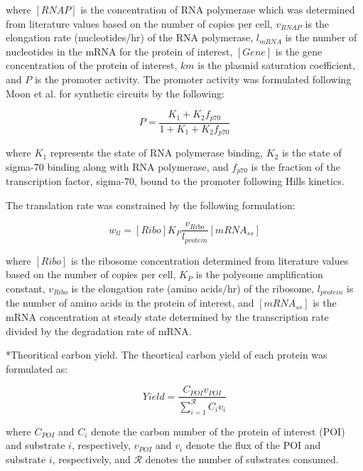 \documentclass[12pt]{article}
\makeatletter
\renewcommand\subsection{\@startsection
	{subsection}{2}{0mm}
	{-0.05in}
	{-0.5\baselineskip}
	{\normalfont\normalsize\bfseries}}
\makeatother
\begin{document}
where $[RNAP]$ is the concentration of RNA polymerase which was determined from literature values based on the number of copies per cell, $v_{RNAP}$ is the elongation rate (nucleotides/hr) of the RNA polymerase, $l_{mRNA}$ is the number of nucleotides in the mRNA for the protein of interest, $[Gene]$ is the gene concentration of the protein of interest, $km$ is the plasmid saturation coefficient, and $P$ is the promoter activity. 
The promoter activity was formulated following Moon et al. for synthetic circuits by the following:

\begin{equation}\nonumber
	P = \frac{K_{1}+K_{2}f_{p70}}{1 + K_{1}+K_{2}f_{p70}}
\end{equation}

where $K_{1}$ represents the state of RNA polymerase binding, $K_{2}$ is the state of sigma-70 binding along with RNA polymerase, and $f_{p70}$ is the fraction of the transcription factor, sigma-70, bound to the promoter following Hills kinetics. 

The translation rate was constrained by the following formulation:

 \begin{equation}\nonumber
	w_{tl} = [Ribo]K_{P}\frac{v_{Ribo}}{l_{protein}}[mRNA_{ss}]
\end{equation}

where $[Ribo]$ is the ribosome concentration determined from literature values based on the number of copies per cell, $K_{P}$ is the polysome amplification constant, $v_{Ribo}$ is the elongation rate (amino acids/hr) of the ribosome, $l_{protein}$ is the number of amino acids in the protein of interest, and $[mRNA_{ss}]$ is the mRNA concentration at steady state determined by the transcription rate divided by the degradation rate of mRNA.  

\subsection*{Theoritical carbon yield.}
The theortical carbon yield of each protein was formulated as:

\begin{equation}\nonumber
	Yield = \frac{C_{POI}v_{POI}}{\sum_{i = 1}^{\mathcal{R}}C_{i}v_{i}}
\end{equation}

where $C_{POI}$ and $C_{i}$ denote the carbon number of the protein of interest (POI) and substrate $i$, respectively, $v_{POI}$ and $v_{i}$ denote the flux of the POI and substrate $i$, respectively,
and $\mathcal{R}$ denotes the number of substrates consumed.
\end{document}
